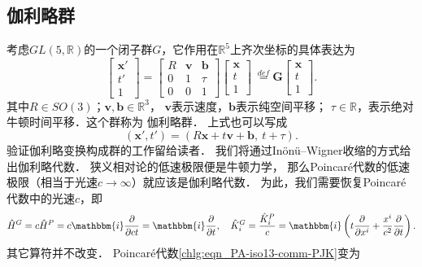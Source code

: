 \subsection{伽利略群}\label{chlg:sec_Galileo-group}
考虑$GL(5, \mathbb{R})$的一个闭子群$G$，它作用在$\mathbb{R}^5$上齐次坐标的具体表达为
\begin{equation}\label{chlg:eqn_Galileo-max}
    \begin{bmatrix}  \boldsymbol{x}' \\ t'\\ 1 \end{bmatrix} =
    \begin{bmatrix}  R & \boldsymbol{v} & \boldsymbol{b} \\0 & 1 & \tau \\ 0 &0 & 1  \end{bmatrix}
    \begin{bmatrix}  \boldsymbol{x} \\t\\ 1 \end{bmatrix} 
    \  \overset{def}{=} \boldsymbol{G} \begin{bmatrix}  \boldsymbol{x} \\ t\\ 1 \end{bmatrix} .
\end{equation}
其中$R \in S O(3)$；$\boldsymbol{v}, \boldsymbol{b} \in \mathbb{R}^3$，
$\boldsymbol{v}$表示速度，$\boldsymbol{b}$表示纯空间平移；
$\tau \in \mathbb{R}$，表示绝对牛顿时间平移．这个群称为 {\heiti 伽利略群}．
上式也可以写成
\begin{equation}
    (\boldsymbol{x}', t') = (R \boldsymbol{x}+t \boldsymbol{v}+ \boldsymbol{b},\ t+\tau) .
\end{equation}
验证伽利略变换构成群的工作留给读者．
我们将通过In\"on\"u--Wigner{\kaishu 收缩}的方式给出伽利略代数．
狭义相对论的低速极限便是牛顿力学，
那么Poincar\'{e}代数的低速极限（相当于光速$c\to \infty$）就应该是伽利略代数．
为此，我们需要恢复Poincar\'{e}代数中的光速$c$，即
\begin{equation}
    \hat{H}^G =c\hat{H}^P = c\mathbbm{i}\frac{\partial }{ \partial ct }
    = \mathbbm{i}\frac{\partial }{ \partial t }, \quad
    \hat{K}_i^G = \frac{\hat{K}_i^P}{c}= \mathbbm{i} \left(t\frac{\partial }{\partial x^i}+  
    \frac{x^i}{c^2}\frac{\partial }{\partial t}\right) .
\end{equation}
其它算符并不改变．
Poincar\'{e}代数\eqref{chlg:eqn_PA-iso13-comm-PJK}变为
